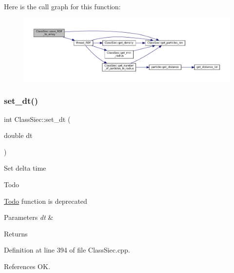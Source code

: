 Here is the call graph for this function\+:
\nopagebreak
\begin{figure}[H]
\begin{center}
\leavevmode
\includegraphics[width=350pt]{classClassSiec_a9c96b5d39e27f8f2bdda6fd60113ceb6_cgraph}
\end{center}
\end{figure}
\mbox{\label{classClassSiec_a2ef8ae6a08683c8ed1c4e9d89b79e08e}} 
\subsubsection{\texorpdfstring{set\+\_\+dt()}{set\_dt()}}
{\footnotesize\ttfamily int Class\+Siec\+::set\+\_\+dt (\begin{DoxyParamCaption}\item[{double}]{dt }\end{DoxyParamCaption})}

Set delta time \begin{DoxyRefDesc}{Todo}
\item[\mbox{\hyperlink{todo__todo000002}{Todo}}]function is deprecated \end{DoxyRefDesc}

\begin{DoxyParams}{Parameters}
{\em dt} & \\
\hline
\end{DoxyParams}
\begin{DoxyReturn}{Returns}

\end{DoxyReturn}


Definition at line 394 of file Class\+Siec.\+cpp.



References OK.

\mbox{\label{classClassSiec_a2adaa0e7fe44a2a68b7eba11c52d21bd}} 
